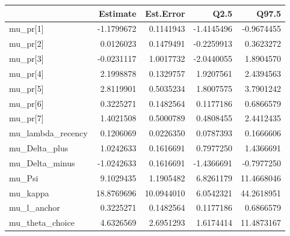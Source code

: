 
\begin{tabular}{lrrrr}
\toprule
  & Estimate & Est.Error & Q2.5 & Q97.5\\
\midrule
mu\_pr[1] & -1.1799672 & 0.1141943 & -1.4145496 & -0.9674455\\
mu\_pr[2] & 0.0126023 & 0.1479491 & -0.2259913 & 0.3623272\\
mu\_pr[3] & -0.0231117 & 1.0017732 & -2.0440055 & 1.8904570\\
mu\_pr[4] & 2.1998878 & 0.1329757 & 1.9207561 & 2.4394563\\
mu\_pr[5] & 2.8119901 & 0.5035234 & 1.8007575 & 3.7901242\\
\addlinespace
mu\_pr[6] & 0.3225271 & 0.1482564 & 0.1177186 & 0.6866579\\
mu\_pr[7] & 1.4021508 & 0.5000789 & 0.4808455 & 2.4412435\\
mu\_lambda\_recency & 0.1206069 & 0.0226350 & 0.0787393 & 0.1666606\\
mu\_Delta\_plus & 1.0242633 & 0.1616691 & 0.7977250 & 1.4366691\\
mu\_Delta\_minus & -1.0242633 & 0.1616691 & -1.4366691 & -0.7977250\\
\addlinespace
mu\_Psi & 9.1029435 & 1.1905482 & 6.8261179 & 11.4668046\\
mu\_kappa & 18.8769696 & 10.0944010 & 6.0542321 & 44.2618951\\
mu\_l\_anchor & 0.3225271 & 0.1482564 & 0.1177186 & 0.6866579\\
mu\_theta\_choice & 4.6326569 & 2.6951293 & 1.6174414 & 11.4873167\\
\bottomrule
\end{tabular}

